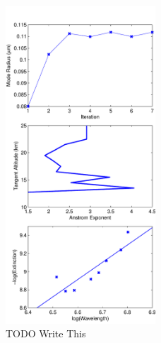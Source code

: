 \documentclass[12pt]{article}
\begin{document}
\begin{figure}
\includegraphics[width=0.5\textwidth]{./Images/ParticelSize.pdf}
    \caption[ALI Radiances]{TODO Write This}
    \label{fig:ParticleSize}
\end{figure}
\end{document}
